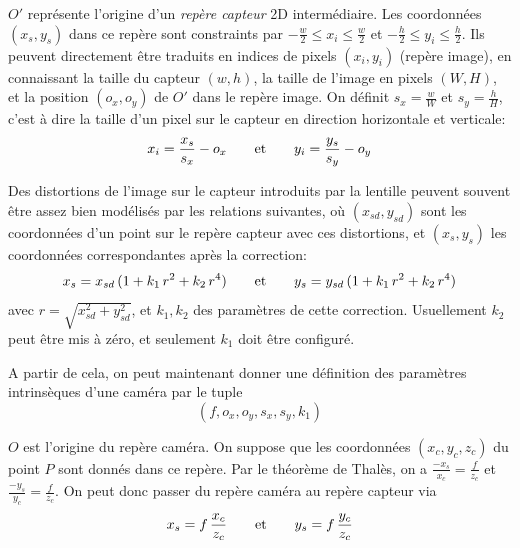 \documentclass[a4paper,10pt]{scrreprt}
\begin{document}
$O'$ représente l'origine d'un \emph{repère capteur} 2D intermédiaire. Les coordonnées $(x_s, y_s)$ dans ce repère sont constraints par $-\frac{w}{2} \leq x_i \leq \frac{w}{2}$ et $-\frac{h}{2} \leq y_i \leq \frac{h}{2}$. Ils peuvent directement être traduits en indices de pixels $(x_i, y_i)$ (repère image), en connaissant la taille du capteur $(w, h)$, la taille de l'image en pixels $(W, H)$, et la position $(o_x, o_y)$ de $O'$ dans le repère image. On définit $s_x = \frac{w}{W}$ et $s_y = \frac{h}{H}$, c'est à dire la taille d'un pixel sur le capteur en direction horizontale et verticale:
\begin{equation}
	x_i = \frac{x_s}{s_x} - o_x
	\hspace{7mm} \text{et} \hspace{7mm}
	y_i = \frac{y_s}{s_y} - o_y
\end{equation}

Des distortions de l'image sur le capteur introduits par la lentille peuvent souvent être assez bien modélisés par les relations suivantes, où $(x_{sd}, y_{sd})$ sont les coordonnées d'un point sur le repère capteur avec ces distortions, et $(x_s, y_s)$ les coordonnées correspondantes après la correction: \cite{Truc1998}
\begin{equation}
	x_s = x_{sd} \, (1 + k_1 \, r^2 + k_2 \, r^4)
	\hspace{7mm} \text{et} \hspace{7mm}
	y_s = y_{sd} \, (1 + k_1 \, r^2 + k_2 \, r^4)
\end{equation}
avec $r = \sqrt{x_{sd}^2 + y_{sd}^2}$, et $k_1, k_2$ des paramètres de cette correction. Usuellement $k_2$ peut être mis à zéro, et seulement $k_1$ doit être configuré.

A partir de cela, on peut maintenant donner une définition des paramètres intrinsèques d'une caméra par le tuple
\begin{equation}
	(f, o_x, o_y, s_x, s_y, k_1)
\end{equation}

$O$ est l'origine du repère caméra. On suppose que les coordonnées $(x_c, y_c, z_c)$ du point $P$ sont donnés dans ce repère. Par le théorème de Thalès, on a $\frac{-x_s}{x_c} = \frac{f}{z_c}$ et $\frac{-y_s}{y_c} = \frac{f}{z_c}$. On peut donc passer du repère caméra au repère capteur via
\begin{equation}
	x_s = f \, \frac{x_c}{z_c}
	\hspace{7mm} \text{et} \hspace{7mm}
	y_s = f \, \frac{y_c}{z_c}	
\end{equation}
\end{document}
